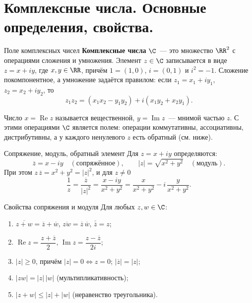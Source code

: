 
\section{Комплексные числа. Основные определения, свойства.}

\begin{Definition}{Поле комплексных чисел}{}
	\textbf{Комплексные числа} $\C$~--- это множество $\RR^2$ с операциями сложения и умножения. Элемент $z \in \C$ записывается в виде $z = x + iy$, где $x, y \in \RR$, причём $1 = (1, 0)$, $i = (0, 1)$ и $i^2 = -1$. Сложение покомпонентное, а умножение задаётся правилом: если $z_1 = x_1 + iy_1$, $z_2 = x_2 + iy_2$, то
	\[
	z_1 z_2 = (x_1 x_2 - y_1 y_2) + i(x_1 y_2 + x_2 y_1).
	\]
\end{Definition}

Число $x = \operatorname{Re} z$ называется вещественной, $y = \operatorname{Im} z$~--- мнимой частью $z$. С этими операциями $\C$ является полем: операции коммутативны, ассоциативны, дистрибутивны, а у каждого ненулевого $z$ есть обратный (см. ниже).

\begin{Definition}{Сопряжение, модуль, обратный элемент}{}
	Для $z = x + iy$ определяются:
	\[
	\overline{z} = x - iy \quad (\text{сопряжённое}), \qquad
	|z| = \sqrt{x^2 + y^2} \quad (\text{модуль}).
	\]
	При этом $z\,\overline{z} = x^2 + y^2 = |z|^2$, и для $z \neq 0$
	\[
	\frac{1}{z} = \frac{\overline{z}}{|z|^2} = \frac{x - iy}{x^2 + y^2} = \frac{x}{x^2 + y^2} - i\,\frac{y}{x^2 + y^2}.
	\]
\end{Definition}

\begin{Statement}{Свойства сопряжения и модуля}{}
	Для любых $z, w \in \C$:
	\begin{enumerate}
		\item $\overline{z + w} = \overline{z} + \overline{w}$, \quad $\overline{zw} = \overline{z}\,\overline{w}$, \quad $\overline{\overline{z}} = z$;
		\item $\operatorname{Re} z = \dfrac{z + \overline{z}}{2}$, \quad $\operatorname{Im} z = \dfrac{z - \overline{z}}{2i}$;
		\item $|z| \ge 0$, причём $|z| = 0 \iff z = 0$; \quad $|\overline{z}| = |z|$;
		\item $|zw| = |z|\,|w|$ (мультипликативность);
		\item $|z + w| \le |z| + |w|$ (неравенство треугольника).
	\end{enumerate}
\end{Statement}

